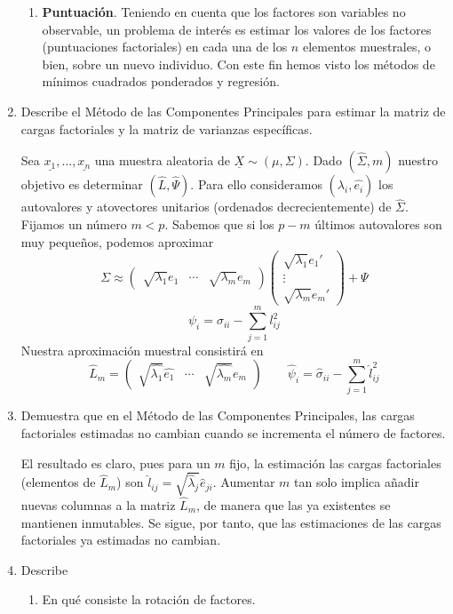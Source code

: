 \documentclass[twoside]{article}
\newcommand{\muestra}[1]{{\underline{#1}}}
\newcommand{\mX}{{\muestra{X}}}
\begin{document}
\begin{enumerate}
\begin{enumerate}
\item \textbf{Puntuación}. Teniendo en cuenta que los factores son variables no observable, un problema de interés
es estimar los valores de los factores (puntuaciones factoriales) en cada una de los $n$ elementos muestrales, o bien, sobre un nuevo individuo. Con este fin hemos visto los métodos de mínimos cuadrados ponderados y regresión.
\end{enumerate}

\item Describe el Método de las Componentes Principales para estimar la matriz de cargas factoriales y la matriz de varianzas específicas.

Sea $\muestra{x_1},\dotsc,\muestra{x_n}$ una muestra aleatoria de $\mX\sim (\mu,\Sigma)$. Dado $(\hat{\Sigma},m)$ nuestro objetivo es determinar $(\hat{L},\hat{\Psi})$. Para ello consideramos $(\hat{\lambda_i},\hat{e_i})$ los autovalores y atovectores unitarios (ordenados decrecientemente) de $\hat{\Sigma}$. Fijamos un número $m<p$. Sabemos que si los $p-m$ últimos autovalores son muy pequeños, podemos aproximar
$$
\Sigma  \approx \begin{pmatrix}
\sqrt{\lambda_1}e_1 & \cdots & \sqrt{\lambda_m}e_m 
\end{pmatrix}
\begin{pmatrix}
\sqrt{\lambda_1}e_1' \\ \vdots \\ \sqrt{\lambda_m}e_m'
\end{pmatrix} + \Psi
$$
$$
\psi_i = \sigma_{ii}-\sum_{j=1}^m l_{ij}^2
$$
Nuestra aproximación muestral consistirá en $$\hat{L}_m=\begin{pmatrix}
\sqrt{\hat{\lambda_1}}\hat{e_1} & \cdots & \sqrt{\hat{\lambda_m}}\hat{e_m}\end{pmatrix} \qquad 	\hat{\psi}_i = \hat{\sigma}_{ii}-\sum_{j=1}^m \hat{l}_{ij}^2
$$
\item Demuestra que en el Método de las Componentes Principales, las cargas factoriales estimadas no cambian cuando se incrementa el número de factores.

El resultado es claro, pues para un $m$ fijo, la estimación las cargas factoriales (elementos de $\hat{L}_m$) son $\hat{l}_{ij}=\sqrt{\hat{\lambda}_j}\hat{e}_{ji}$. Aumentar $m$ tan solo implica añadir nuevas columnas a la matriz $\hat{L}_m$, de manera que las ya existentes se mantienen inmutables. Se sigue, por tanto, que las estimaciones de las cargas factoriales ya estimadas no cambian.
\item Describe
\begin{enumerate}
	\item En qué consiste la rotación de factores.


\end{enumerate}
\end{enumerate}
\end{document}
